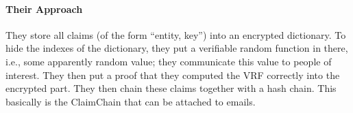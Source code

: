 \documentclass{article}
\begin{document}
\paragraph{Their Approach}
They store all claims (of the form ``entity, key'') into an encrypted dictionary. To hide the indexes of the dictionary, they put a verifiable random function in there, i.e., some apparently random value; they communicate this value to people of interest. They then put a proof that they computed the VRF correctly into the encrypted part. They then chain these claims together with a hash chain. This basically is the ClaimChain that can be attached to emails.






\end{document}
